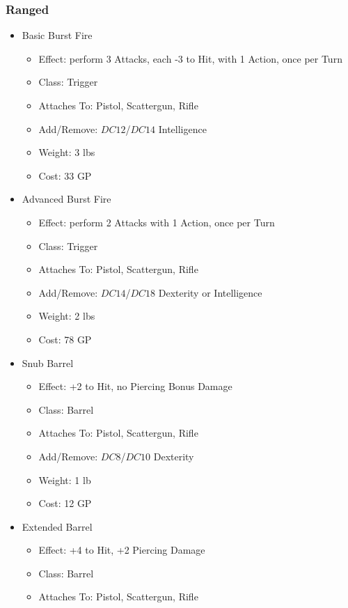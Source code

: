 \documentclass[12pt, twoside]{article}
\begin{document}
\begin{FlushLeft}
\begin{multicols}{2}
			\subsubsection{Ranged}
			\begin{itemize}[wide]
				\item Basic Burst Fire
				\begin{itemize}
					\item Effect: perform 3 Attacks, each -3 to Hit, with 1 Action, once per Turn
					\item Class: Trigger
					\item Attaches To: Pistol, Scattergun, Rifle
					\item Add/Remove: $DC12$/$DC14$ Intelligence
					\item Weight: 3 lbs
					\item Cost: 33 GP
				\end{itemize}
				\item Advanced Burst Fire
				\begin{itemize}
					\item Effect: perform 2 Attacks with 1 Action, once per Turn
					\item Class: Trigger
					\item Attaches To: Pistol, Scattergun, Rifle
					\item Add/Remove: $DC14$/$DC18$ Dexterity or Intelligence
					\item Weight: 2 lbs
					\item Cost: 78 GP
				\end{itemize}
				\item Snub Barrel
				\begin{itemize}
					\item Effect: +2 to Hit, no Piercing Bonus Damage  
					\item Class: Barrel
					\item Attaches To: Pistol, Scattergun, Rifle
					\item Add/Remove: $DC8$/$DC10$ Dexterity
					\item Weight: 1 lb
					\item Cost: 12 GP
				\end{itemize}
				\item Extended Barrel
				\begin{itemize}
					\item Effect: +4 to Hit, +2 Piercing Damage
					\item Class: Barrel
					\item Attaches To: Pistol, Scattergun, Rifle

\end{itemize}
\end{itemize}
\end{multicols}
\end{FlushLeft}
\end{document}
